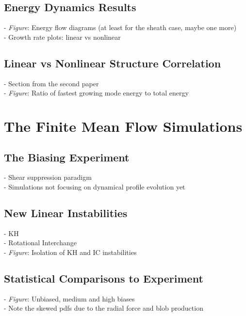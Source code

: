 \documentclass[12pt]{article}
\begin{document}
\subsection{Energy Dynamics Results}

- \emph{Figure}: Energy flow diagrams (at least for the sheath case, maybe one more) \\
- Growth rate plots: linear vs nonlinear \\

\subsection{Linear vs Nonlinear Structure Correlation}

- Section from the second paper \\
- \emph{Figure}: Ratio of fastest growing mode energy to total energy \\

\section{The Finite Mean Flow Simulations}

\subsection{The Biasing Experiment}

- Shear suppression paradigm \\
- Simulations not focusing on dynamical profile evolution yet \\

\subsection{New Linear Instabilities}

- KH \\
- Rotational Interchange \\
- \emph{Figure}: Isolation of KH and IC instabilities

\subsection{Statistical Comparisons to Experiment}

- \emph{Figure}: Unbiased, medium and high biases \\
- Note the skewed pdfs due to the radial force and blob production \\
\end{document}
